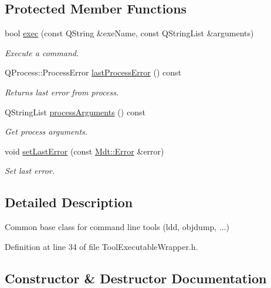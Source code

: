 \subsection*{Protected Member Functions}
\begin{DoxyCompactItemize}
\item 
bool \hyperlink{class_mdt_1_1_deploy_utils_1_1_tool_executable_wrapper_a82d75a83041420d10cb163c084e9828c}{exec} (const Q\+String \&exe\+Name, const Q\+String\+List \&arguments)
\begin{DoxyCompactList}\small\item\em Execute a command. \end{DoxyCompactList}\item 
Q\+Process\+::\+Process\+Error \hyperlink{class_mdt_1_1_deploy_utils_1_1_tool_executable_wrapper_a4a94d5952557daed5e91dafb8d4fef85}{last\+Process\+Error} () const 
\begin{DoxyCompactList}\small\item\em Returns last error from process. \end{DoxyCompactList}\item 
Q\+String\+List \hyperlink{class_mdt_1_1_deploy_utils_1_1_tool_executable_wrapper_ab85cd91b9a6a681624119b316d503e8a}{process\+Arguments} () const 
\begin{DoxyCompactList}\small\item\em Get process arguments. \end{DoxyCompactList}\item 
void \hyperlink{class_mdt_1_1_deploy_utils_1_1_tool_executable_wrapper_a13671f8e384893777fd1633dc4984244}{set\+Last\+Error} (const \hyperlink{class_mdt_1_1_error}{Mdt\+::\+Error} \&error)
\begin{DoxyCompactList}\small\item\em Set last error. \end{DoxyCompactList}\end{DoxyCompactItemize}


\subsection{Detailed Description}
Common base class for command line tools (ldd, objdump, ...) 

Definition at line 34 of file Tool\+Executable\+Wrapper.\+h.



\subsection{Constructor \& Destructor Documentation}
